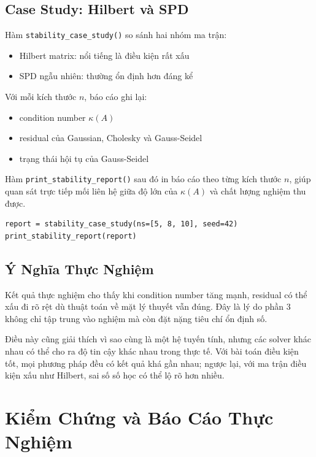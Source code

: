 \documentclass[12pt, a4paper, twoside]{article}
\begin{document}
\subsection{Case Study: Hilbert và SPD}

Hàm \texttt{stability\_case\_study()} so sánh hai nhóm ma trận:
\begin{itemize}
    \item Hilbert matrix: nổi tiếng là điều kiện rất xấu
    \item SPD ngẫu nhiên: thường ổn định hơn đáng kể
\end{itemize}

Với mỗi kích thước $n$, báo cáo ghi lại:
\begin{itemize}
    \item condition number $\kappa(A)$
    \item residual của Gaussian, Cholesky và Gauss-Seidel
    \item trạng thái hội tụ của Gauss-Seidel
\end{itemize}

Hàm \texttt{print\_stability\_report()} sau đó in báo cáo theo từng kích thước $n$, giúp quan sát trực tiếp mối liên hệ giữa độ lớn của $\kappa(A)$ và chất lượng nghiệm thu được.

\begin{lstlisting}
report = stability_case_study(ns=[5, 8, 10], seed=42)
print_stability_report(report)
\end{lstlisting}

\subsection{Ý Nghĩa Thực Nghiệm}

Kết quả thực nghiệm cho thấy khi condition number tăng mạnh, residual có thể xấu đi rõ rệt dù thuật toán về mặt lý thuyết vẫn đúng. Đây là lý do phần 3 không chỉ tập trung vào nghiệm mà còn đặt nặng tiêu chí ổn định số.

Điều này cũng giải thích vì sao cùng là một hệ tuyến tính, nhưng các solver khác nhau có thể cho ra độ tin cậy khác nhau trong thực tế. Với bài toán điều kiện tốt, mọi phương pháp đều có kết quả khá gần nhau; ngược lại, với ma trận điều kiện xấu như Hilbert, sai số số học có thể lộ rõ hơn nhiều.

\section{Kiểm Chứng và Báo Cáo Thực Nghiệm}
\end{document}
